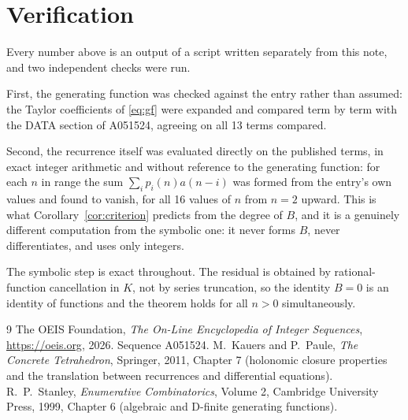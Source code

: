 \documentclass[11pt,a4paper]{article}
\theoremstyle{plain}
\theoremstyle{definition}
\begin{document}
\section{Verification}

Every number above is an output of a script written separately from this note, and two
independent checks were run.

First, the generating function was checked against the entry rather than assumed: the
Taylor coefficients of \eqref{eq:gf} were expanded and compared term by term with the DATA
section of A051524, agreeing on all 13 terms compared.

Second, the recurrence itself was evaluated directly on the published terms, in exact
integer arithmetic and without reference to the generating function: for each $n$ in range
the sum $\sum_{i}p_{i}(n)a(n-i)$ was formed from the entry's own values and found to
vanish, for all 16 values of $n$ from $n=2$ upward. This is what
Corollary~\ref{cor:criterion} predicts from the degree of $B$, and it is a genuinely
different computation from the symbolic one: it never forms $B$, never differentiates, and
uses only integers.

The symbolic step is exact throughout. The residual is obtained by rational-function
cancellation in $K$, not by series truncation, so the identity $B=0$ is an
identity of functions and the theorem holds for all $n>0$ simultaneously.

\begin{thebibliography}{9}
 The OEIS Foundation, \emph{The On-Line Encyclopedia of Integer Sequences},
\url{https://oeis.org}, 2026. Sequence A051524.
 M.~Kauers and P.~Paule, \emph{The Concrete Tetrahedron}, Springer, 2011,
Chapter 7 (holonomic closure properties and the translation between recurrences and
differential equations).
 R.~P.~Stanley, \emph{Enumerative Combinatorics}, Volume 2, Cambridge
University Press, 1999, Chapter 6 (algebraic and D-finite generating functions).
\end{thebibliography}
\end{document}
